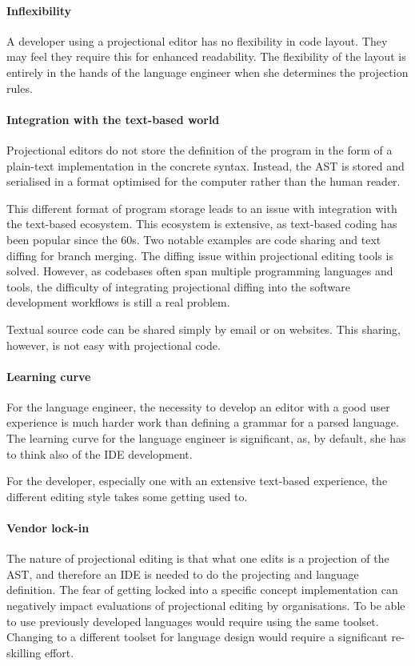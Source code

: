 \paragraph{Inflexibility} A developer using a projectional editor has no flexibility in code layout. They may feel they require this for enhanced readability.
The flexibility of the layout is entirely in the hands of the language engineer when she determines the projection rules.

\paragraph{Integration with the text-based world} Projectional editors do not store the definition of the program in the form of a plain-text implementation in the concrete syntax.
Instead, the AST is stored and serialised in a format optimised for the computer rather than the human reader.

This different format of program storage leads to an issue with integration with the text-based ecosystem.
This ecosystem is extensive, as text-based coding has been popular since the 60s.
Two notable examples are code sharing and text diffing for branch merging.
The diffing issue within projectional editing tools is solved.
However, as codebases often span multiple programming languages and tools, the difficulty of integrating projectional diffing into the software development workflows is still a real problem.

Textual source code can be shared simply by email or on websites. 
This sharing, however, is not easy with projectional code.

\paragraph{Learning curve} For the language engineer, the necessity to develop an editor with a good user experience is much harder work than defining a grammar for a parsed language.
The learning curve for the language engineer is significant, as, by default, she has to think also of the IDE development.

For the developer, especially one with an extensive text-based experience, the different editing style takes some getting used to.

\paragraph{Vendor lock-in} The nature of projectional editing is that what one edits is a projection of the AST, and therefore an IDE is needed to do the projecting and language definition.
The fear of getting locked into a specific concept implementation can negatively impact evaluations of projectional editing by organisations.
To be able to use previously developed languages would require using the same toolset.
Changing to a different toolset for language design would require a significant re-skilling effort.